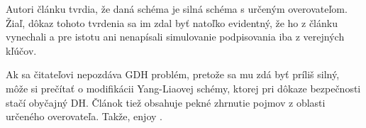 Autori článku tvrdia, že daná schéma je silná schéma s určeným
overovateľom. Žiaľ, dôkaz tohoto tvrdenia sa im zdal byť natoľko evidentný, 
že ho z článku vynechali a pre istotu ani nenapísali simulovanie
podpisovania iba z verejných kľúčov.

\begin{poznamka}
    Ak sa čitateľovi nepozdáva GDH problém, pretože sa mu zdá byť
    príliš silný, môže si prečítať o modifikácii Yang-Liaovej schémy,
    ktorej pri dôkaze bezpečnosti stačí obyčajný DH. Článok tiež
    obsahuje pekné zhrnutie pojmov z oblasti určeného overovateľa.
    Takže, enjoy \cite{designated_verifier_stanek}.
\end{poznamka}
